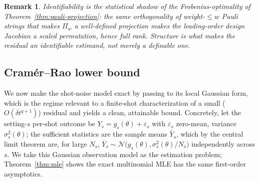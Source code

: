 \documentclass[aps,prxquantum,reprint,superscriptaddress,nofootinbib,amsmath,amssymb]{revtex4-2}
\newcommand{\dt}{\delta t}
\newtheorem{remark}{Remark}
\begin{document}
\begin{remark}
Identifiability is the statistical shadow of the Frobenius-optimality of Theorem~\ref{thm:pauli-projection}: the same orthogonality of weight-$\leq w$ Pauli strings that makes $\Pi_w$ a well-defined projection makes the leading-order design Jacobian a scaled permutation, hence full rank. Structure is what makes the residual an \emph{identifiable} estimand, not merely a definable one.
\end{remark}

\subsection{Cram\'er--Rao lower bound}
\label{app:inference-crb}

We now make the shot-noise model exact by passing to its local Gaussian form, which is the regime relevant to a finite-shot characterization of a small ($O(\dt^{q+1})$) residual and yields a clean, attainable bound. Concretely, let the setting-$s$ per-shot outcome be $Y_{s}=g_s(\theta)+\varepsilon_s$ with $\varepsilon_s$ zero-mean, variance $\sigma_s^2(\theta)$; the sufficient statistics are the sample means $\bar Y_s$, which by the central limit theorem are, for large $N_s$, $\bar Y_s\sim\mathcal{N}\!\bigl(g_s(\theta),\sigma_s^2(\theta)/N_s\bigr)$ independently across $s$. We take this Gaussian observation model as the estimation problem; Theorem~\ref{thm:mle} shows the exact multinomial MLE has the same first-order asymptotics.
\end{document}
